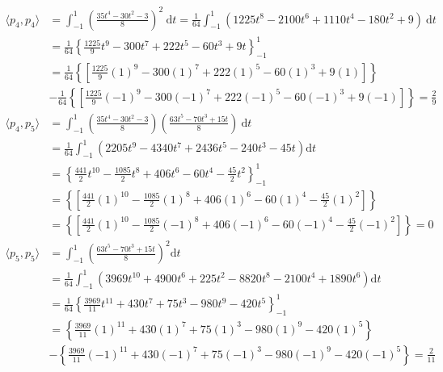 \begin{align*}
\langle p_4,p_4 \rangle &= \int_{-1}^{1} \left(\frac{35t^4-30t^2-3}{8}\right)^2\:\mathrm{d}t = \frac{1}{64}\int_{-1}^{1}\left(1225t^8-2100t^6+1110t^4-180t^2+9\right)\:\mathrm{d}t \\
&= \frac{1}{64}\left\lbrace\frac{1225}{9}t^9 -300t^7 + 222t^5 - 60t^3+9t\right\rbrace_{-1}^{1} \\
&= \frac{1}{64}\left\lbrace\left[\frac{1225}{9}(1)^9 -300(1)^7 + 222(1)^5 - 60(1)^3+9(1)\right]\right\rbrace \\
&- \frac{1}{64}\left\lbrace\left[\frac{1225}{9}(-1)^9 -300(-1)^7 + 222(-1)^5 - 60(-1)^3+9(-1)\right]\right\rbrace = \boxed{\frac{2}{9}} \\
\langle p_4,p_5 \rangle &= \int_{-1}^{1} \left(\frac{35t^4-30t^2-3}{8}\right)\left(\frac{63t^5-70t^3+15t}{8}\right)\:\mathrm{d}t\\ &= \frac{1}{64}\int_{-1}^{1} \left(2205 t^9-4340 t^7+2436 t^5-240 t^3-45 t\right) \mathrm{d}t \\
&= \left\lbrace \frac{441}{2}t^{10}-\frac{1085}{2}t^8+406 t^6-60 t^4-\frac{45}{2}t^2 \right\rbrace_{-1}^{1} \\
&= \left\lbrace\left[ \frac{441}{2}(1)^{10}-\frac{1085}{2}(1)^8+406 (1)^6-60(1)^4-\frac{45}{2}(1)^2 \right]\right\rbrace \\ &= \left\lbrace\left[ \frac{441}{2}(1)^{10}-\frac{1085}{2}(-1)^8+406 (-1)^6-60(-1)^4-\frac{45}{2}(-1)^2 \right]\right\rbrace = \boxed{0}
\end{align*}
\begin{align*}
\langle p_5, p_5 \rangle &= \int_{-1}^{1} \left(\frac{63t^5-70t^3+15t}{8}\right)^2\mathrm{d}t \\ &= \frac{1}{64}\int_{-1}^{1}\left(3969t^{10}+4900t^6+225t^2-8820t^8-2100t^4+1890t^6\right)\mathrm{d}t \\
&= \frac{1}{64}\left\lbrace\frac{3969}{11}t^{11}+430t^7+75t^3-980t^9-420t^5\right\rbrace_{-1}^{1} \\
&=\left\lbrace\frac{3969}{11}(1)^{11}+430(1)^7+75(1)^3-980(1)^9-420(1)^5\right\rbrace\\ &- \left\lbrace\frac{3969}{11}(-1)^{11}+430(-1)^7+75(-1)^3-980(-1)^9-420(-1)^5\right\rbrace = \boxed{\frac{2}{11}}
\end{align*}

